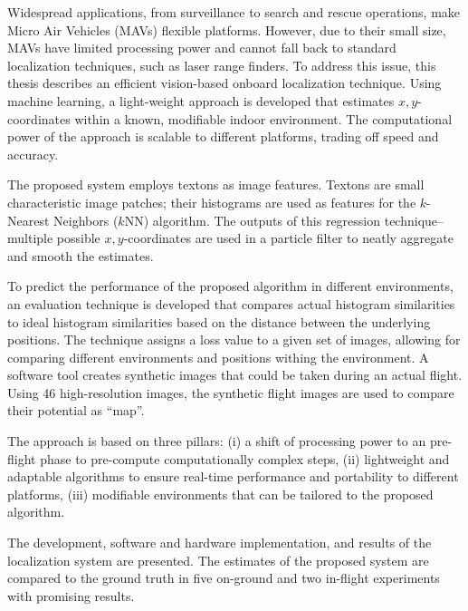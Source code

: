 Widespread applications, from surveillance to search and rescue operations, make Micro Air Vehicles (MAVs) flexible platforms.
However, due to their small size, MAVs have limited processing power and cannot
fall back to standard localization techniques, such as laser range finders. To address this
issue, this thesis describes an efficient vision-based onboard localization
technique. Using machine learning, a light-weight approach is developed that estimates $x,y$-coordinates within a known, modifiable indoor environment. The computational power of the approach is scalable to different platforms, trading off speed and accuracy.

The proposed system employs 
textons as image features. Textons are small characteristic image patches; their histograms are used as features for the $k$-Nearest Neighbors ($k$NN)
algorithm. The outputs of this regression technique--multiple possible
$x, y$-coordinates are used in a particle filter to neatly aggregate
and smooth the estimates.


To predict the performance of the proposed algorithm in different environments, an evaluation
technique is developed that compares actual histogram similarities to
ideal histogram similarities based on the distance between the underlying
positions. The technique assigns a loss value to a given set of
images, allowing for comparing different environments and positions withing the environment. A software tool creates synthetic images
that could be taken during an actual flight. Using 46 high-resolution images, the synthetic flight images are used to compare their potential as ``map''.


The approach is based on three pillars: (i) a shift of processing power to an pre-flight phase to pre-compute
computationally complex steps, (ii) lightweight and adaptable algorithms to ensure real-time performance and portability to different platforms,
(iii) modifiable environments that can be tailored to the proposed algorithm. 

The development, software and hardware
implementation, and results of the localization system are presented.
The estimates of the proposed system are compared to the ground truth in five on-ground and two
in-flight experiments with promising results.